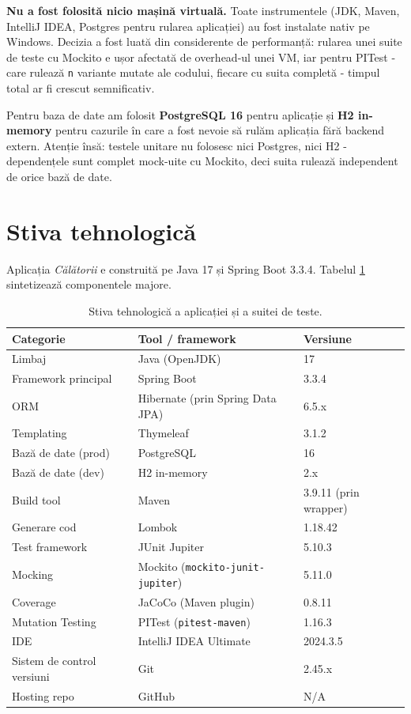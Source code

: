 \textbf{Nu a fost folosită nicio mașină virtuală.} Toate instrumentele (JDK, Maven, IntelliJ IDEA, Postgres pentru rularea aplicației) au fost instalate nativ pe Windows. Decizia a fost luată din considerente de performanță: rularea unei suite de teste cu Mockito e ușor afectată de overhead-ul unei VM, iar pentru PITest - care rulează \texttt{n} variante mutate ale codului, fiecare cu suita completă - timpul total ar fi crescut semnificativ.

Pentru baza de date am folosit \textbf{PostgreSQL 16} pentru aplicație și \textbf{H2 in-memory} pentru cazurile în care a fost nevoie să rulăm aplicația fără backend extern. Atenție însă: testele unitare nu folosesc nici Postgres, nici H2 - dependențele sunt complet mock-uite cu Mockito, deci suita rulează independent de orice bază de date.

\section{Stiva tehnologică}

Aplicația \textit{Călătorii} e construită pe Java 17 și Spring Boot 3.3.4. Tabelul \ref{tab:stack} sintetizează componentele majore.

\begin{table}[!htb]
\centering
\caption{Stiva tehnologică a aplicației și a suitei de teste.}
\label{tab:stack}
\begin{tabular}{lll}
\toprule
\textbf{Categorie} & \textbf{Tool / framework} & \textbf{Versiune} \\
\midrule
Limbaj & Java (OpenJDK) & 17 \\
Framework principal & Spring Boot & 3.3.4 \\
ORM & Hibernate (prin Spring Data JPA) & 6.5.x \\
Templating & Thymeleaf & 3.1.2 \\
Bază de date (prod) & PostgreSQL & 16 \\
Bază de date (dev) & H2 in-memory & 2.x \\
Build tool & Maven & 3.9.11 (prin wrapper) \\
Generare cod & Lombok & 1.18.42 \\
\midrule
Test framework & JUnit Jupiter & 5.10.3 \\
Mocking & Mockito (\texttt{mockito-junit-jupiter}) & 5.11.0 \\
Coverage & JaCoCo (Maven plugin) & 0.8.11 \\
Mutation Testing & PITest (\texttt{pitest-maven}) & 1.16.3 \\
\midrule
IDE & IntelliJ IDEA Ultimate & 2024.3.5 \\
Sistem de control versiuni & Git & 2.45.x \\
Hosting repo & GitHub & N/A \\
\bottomrule
\end{tabular}
\end{table}


